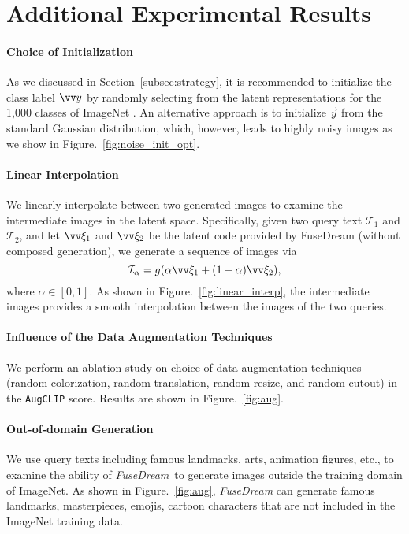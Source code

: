 \documentclass[10pt,twocolumn,letterpaper]{article}
\newcommand{\our}{\emph{FuseDream}}
\newcommand{\ourloss}{\texttt{AugCLIP}}
\begin{document}
\section{Additional Experimental Results}

\paragraph{Choice of Initialization} As we discussed in  Section~\ref{subsec:strategy}, 
it is recommended to initialize the class label $\vv y$ by randomly selecting from the latent representations for the 1,000 classes of ImageNet 
. 
An alternative approach is to initialize $\vec y$ from the standard Gaussian distribution, 
which, however, leads to highly noisy images as we show in Figure.~\ref{fig:noise_init_opt}. 
\vspace{.5\baselineskip}

\paragraph{Linear Interpolation} We linearly interpolate between two generated images to examine the intermediate images in the latent space.
Specifically, 
given two query text $\mathcal T_1$ and $\mathcal T_2$, 
and let $\vv \xi_1$ and $\vv \xi_2$ be the latent code provided by FuseDream (without composed generation), 
 we generate a sequence of images via 
 $$\mathcal I_\alpha = 
 g(\alpha\vv \xi_1 + (1-\alpha)\vv \xi_2 ), 
 $$
 where $\alpha \in[0,1]$. 
As shown in Figure.~\ref{fig:linear_interp}, 
the intermediate images provides a smooth 
interpolation between the images of the two queries. 
\vspace{.5\baselineskip}

\paragraph{Influence of the Data Augmentation Techniques} We perform an ablation study on choice of  data augmentation techniques (random colorization, random translation, random resize, and random cutout) in the {\ourloss} score.  Results are shown in Figure.~\ref{fig:aug}. 

\vspace{.5\baselineskip}

\paragraph{Out-of-domain Generation} We use query texts including famous landmarks, arts, animation figures, etc., to examine the ability of \our~to generate images outside the training domain of ImageNet. 
As shown in Figure.~\ref{fig:aug}, 
{\our} can generate famous landmarks, masterpieces, emojis, cartoon characters that 
are not included in the ImageNet training data. 
\vspace{.5\baselineskip}
\end{document}
